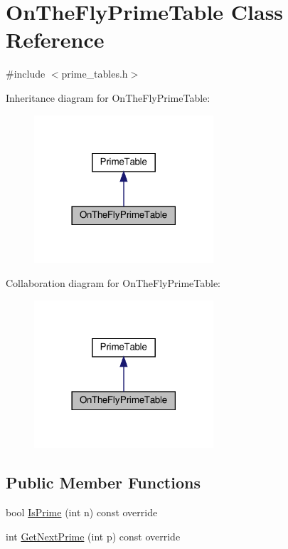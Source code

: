 \hypertarget{classOnTheFlyPrimeTable}{}\section{On\+The\+Fly\+Prime\+Table Class Reference}
\label{classOnTheFlyPrimeTable}


{\ttfamily \#include $<$prime\+\_\+tables.\+h$>$}



Inheritance diagram for On\+The\+Fly\+Prime\+Table\+:\nopagebreak
\begin{figure}[H]
\begin{center}
\leavevmode
\includegraphics[width=189pt]{classOnTheFlyPrimeTable__inherit__graph}
\end{center}
\end{figure}


Collaboration diagram for On\+The\+Fly\+Prime\+Table\+:\nopagebreak
\begin{figure}[H]
\begin{center}
\leavevmode
\includegraphics[width=189pt]{classOnTheFlyPrimeTable__coll__graph}
\end{center}
\end{figure}
\subsection*{Public Member Functions}
\begin{DoxyCompactItemize}
\item 
bool \hyperlink{classOnTheFlyPrimeTable_ac8236514299e4558a5220c3e06f7f61a}{Is\+Prime} (int n) const override
\item 
int \hyperlink{classOnTheFlyPrimeTable_a0f6f934f318407a812098e67584b60bf}{Get\+Next\+Prime} (int p) const override
\end{DoxyCompactItemize}


